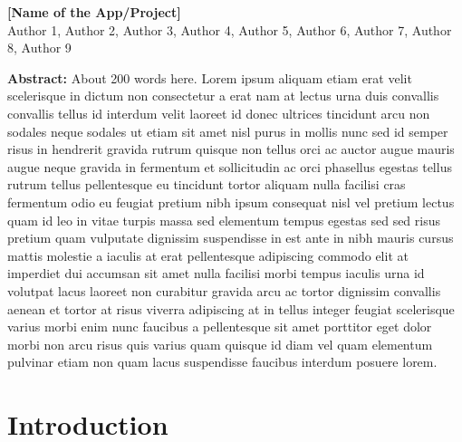 \documentclass[12pt]{article}
\begin{document}
\begin{titlepage}
    \centering
    {\Huge \bfseries [Name of the App/Project]}\\[0.2cm]
    \vspace*{0.5cm}
    {\large Author 1, Author 2, Author 3, Author 4, Author 5, Author 6, Author 7, Author 8, Author 9}\\[2cm] %
    \vspace*{1cm}

    \begin{minipage}{0.9\textwidth}

        \textbf{Abstract:} About 200 words here. Lorem ipsum aliquam
        etiam erat velit scelerisque in dictum non consectetur a erat nam at lectus
        urna duis convallis convallis tellus id interdum velit laoreet id donec
        ultrices tincidunt arcu non sodales neque sodales ut etiam sit amet nisl
        purus in mollis nunc sed id semper risus in hendrerit gravida rutrum
        quisque non tellus orci ac auctor augue mauris augue neque gravida in
        fermentum et sollicitudin ac orci phasellus egestas tellus rutrum tellus
        pellentesque eu tincidunt tortor aliquam nulla facilisi cras fermentum odio
        eu feugiat pretium nibh ipsum consequat nisl vel pretium lectus quam id leo
        in vitae turpis massa sed elementum tempus egestas sed sed risus pretium
        quam vulputate dignissim suspendisse in est ante in nibh mauris cursus
        mattis molestie a iaculis at erat pellentesque adipiscing commodo elit at
        imperdiet dui accumsan sit amet nulla facilisi morbi tempus iaculis urna id
        volutpat lacus laoreet non curabitur gravida arcu ac tortor dignissim
        convallis aenean et tortor at risus viverra adipiscing at in tellus integer
        feugiat scelerisque varius morbi enim nunc faucibus a pellentesque sit amet
        porttitor eget dolor morbi non arcu risus quis varius quam quisque id diam
        vel quam elementum pulvinar etiam non quam lacus suspendisse faucibus
        interdum posuere lorem.

    \end{minipage}
\end{titlepage}
\thispagestyle{fancy}

\newpage

\tableofcontents
\thispagestyle{empty}

\newpage

\setcounter{page}{1}


\section{Introduction}
\end{document}

